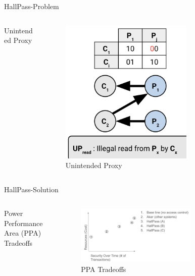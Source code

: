 \begin{frame}{HallPass-Problem}
    \begin{columns}
        \begin{column}{0.5\textwidth}
            Unintended Proxy
        \end{column}
        \begin{column}{0.5\textwidth}
            \begin{figure}
            \centering
            \includegraphics[height=0.7\textheight,width=0.7\textwidth,keepaspectratio]{proxy.png}
            \caption{Unintended Proxy}
        \end{figure}
        \end{column}
    \end{columns}
\end{frame}

\begin{frame}{HallPass-Solution}
    \begin{columns}
        \begin{column}{0.5\textwidth}
        Power Performance Area (PPA) Tradeoffs
        \end{column}
        \begin{column}{0.5\textwidth}
            \begin{figure}
            \centering
            \includegraphics[height=0.7\textheight,width=0.7\textwidth,keepaspectratio]{tradeoffs.png}
            \caption{PPA Tradeoffs}
            \end{figure}
        \end{column}
    \end{columns}
\end{frame}
